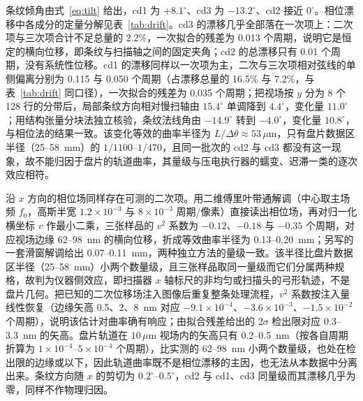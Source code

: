 \documentclass[12pt,a4paper,fontset=windows]{ctexart}
\begin{document}
条纹倾角由式~\eqref{eq:tilt} 给出，cd1 为 $+8.1^\circ$、cd3 为 $-13.2^\circ$、cd2 接近 $0^\circ$。相位漂移中各成分的定量分解见表~\ref{tab:drift}。cd3 的漂移几乎全部落在一次项上：二次项与三次项合计不足总量的 2.2\%，一次拟合的残差为 0.013 个周期，说明它是恒定的横向位移，即条纹与扫描轴之间的固定夹角；cd2 的总漂移只有 0.01 个周期，没有系统性位移。cd1 的漂移同样以一次项为主，二次与三次项相对弦线的单侧偏离分别为 0.115 与 0.050 个周期（占漂移总量的 16.5\% 与 7.2\%，与表~\ref{tab:drift} 同口径），一次拟合的残差为 0.035 个周期；把视场按 $y$ 分为 8 个 128 行的分带后，局部条纹方向相对慢扫轴由 $15.4^\circ$ 单调降到 $4.4^\circ$，变化量 $11.0^\circ$；用结构张量分块法独立核验，条纹法线角由 $-14.9^\circ$ 转到 $-4.0^\circ$，变化量 $10.8^\circ$，与相位法的结果一致。该变化等效的曲率半径为 $L/\Delta\theta\approx53\,\mu\mathrm{m}$，只有盘片数据区半径（25--58~mm）的 $1/1100$--$1/470$，且同一批次的 cd2 与 cd3 都没有这一现象，故不能归因于盘片的轨道曲率，其量级与压电执行器的蠕变、迟滞一类的逐次效应相符\cite{croft2001}。

沿 $x$ 方向的相位场同样存在可测的二次项。用二维傅里叶带通解调（中心取主场频 $f_0$，高斯半宽 $1.2\times10^{-3}$ 与 $8\times10^{-3}$ 周期/像素）直接读出相位场，再对归一化横坐标 $v$ 作最小二乘，三张样品的 $v^2$ 系数为 $-0.12$、$-0.18$ 与 $-0.35$ 个周期，对应视场边缘 62--98~nm 的横向位移，折成等效曲率半径为 0.13--0.20~mm；另写的一套滑窗解调给出 0.07--0.11~mm，两种独立方法的量级一致。该半径比盘片数据区半径（25--58~mm）小两个数量级，且三张样品取同一量级而它们分属两种规格，故判为仪器侧效应，即扫描器 $x$ 轴标尺的非均匀或扫描头的弓形轨迹，不是盘片几何。把已知的二次位移场注入图像后重复整条处理流程，$v^2$ 系数按注入量线性恢复（边缘矢高 0.5、2、8~nm 对应 $-9.1\times10^{-4}$、$-3.6\times10^{-3}$、$-1.5\times10^{-2}$ 个周期），说明该估计对曲率确有响应；由拟合残差给出的 2$\sigma$ 检出限对应 0.3--3.3~nm 的矢高。盘片轨道在 $10\,\mu\mathrm{m}$ 视场内的矢高只有 0.2--0.5~nm（按各自周期折算为 $1\times10^{-4}$--$5\times10^{-4}$ 个周期），比实测的 62--98~nm 小两个数量级，也处在检出限的边缘或以下，因此轨道曲率既不是相位漂移的主因，也无法从本数据中分离出来。条纹方向随 $x$ 的剪切为 $0.2^\circ$--$0.5^\circ$，cd2 与 cd1、cd3 同量级而其漂移几乎为零，同样不作物理归因。
\end{document}

